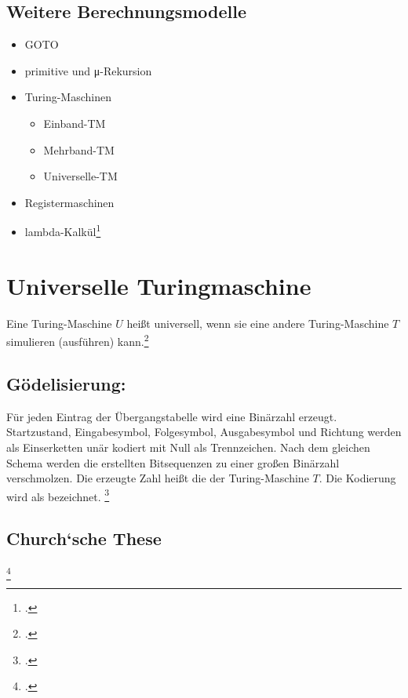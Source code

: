 \documentclass{lehramt-informatik-haupt}
\begin{document}
\subsection{Weitere Berechnungsmodelle}

\begin{itemize}
\item GOTO
\item primitive und μ-Rekursion

\item Turing-Maschinen
\begin{itemize}
\item Einband-TM
\item Mehrband-TM
\item Universelle-TM
\end{itemize}

\item Registermaschinen
\item lambda-Kalkül\footcite[Seite 17]{theo:fs:4}
\end{itemize}

%

\section{Universelle Turingmaschine}


Eine Turing-Maschine $U$ heißt universell, wenn sie eine andere
Turing-Maschine $T$ simulieren (ausführen) kann.\footcite[Seite
23]{theo:fs:4}

\subsection{Gödelisierung:}

Für jeden Eintrag der Übergangstabelle wird eine Binärzahl erzeugt.
Startzustand, Eingabesymbol, Folgesymbol, Ausgabesymbol und Richtung
werden als Einserketten unär kodiert mit Null als Trennzeichen. Nach dem
gleichen Schema werden die erstellten Bitsequenzen zu einer großen
Binärzahl verschmolzen. Die erzeugte Zahl heißt die 
der Turing-Maschine $T$. Die Kodierung wird als 
bezeichnet.
\footcite[Seite 23]{theo:fs:4}

\subsection{Church‘sche These}
\footcite{wiki:church-these}
\end{document}
